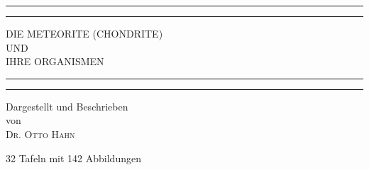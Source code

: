 \documentclass[a4paper, 12pt, oneside]{article}
\begin{document}
\begin{titlepage} %
	\centering %
	\scshape %

	
	\rule{\textwidth}{1.6pt}\vspace*{-\baselineskip}\vspace*{2pt} %
	\rule{\textwidth}{0.4pt} %
	
	\vspace{0.75\baselineskip} %
	
	{\LARGE DIE METEORITE (CHONDRITE)\\ UND\\ IHRE ORGANISMEN\\} %
	
	\vspace{0.75\baselineskip} %
	
	\rule{\textwidth}{0.4pt}\vspace*{-\baselineskip}\vspace{3.2pt} %
	\rule{\textwidth}{1.6pt} %
	
	\vspace{1\baselineskip} %
	
	
	{Dargestellt und Beschrieben\\ von\\ \scshape\Large Dr. Otto Hahn\\} %
	
	\vspace*{1\baselineskip} %
	
    {\small 32 Tafeln mit 142 Abbildungen} %
    
	
	\vspace{1\baselineskip} %
	
	

\end{titlepage}
\end{document}
